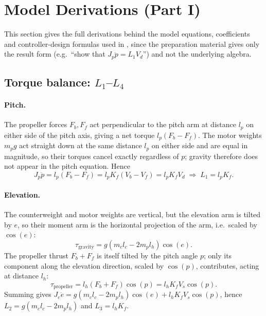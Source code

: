 \appendix

\section{Model Derivations (Part I)}\label{app:part1_derivations}
This section gives the full derivations behind the model equations, coefficients and controller-design formulas used in , since the preparation material gives only the result form (e.g.\ ``show that $J_p\ddot p=L_1V_d$'') and not the underlying algebra.

\subsection{Torque balance: $L_1$--$L_4$}\label{app:L_derivation}
\paragraph{Pitch.} The propeller forces $F_b,F_f$ act perpendicular to the pitch arm at distance $l_p$ on either side of the pitch axis, giving a net torque $l_p(F_b-F_f)$. The motor weights $m_pg$ act straight down at the same distance $l_p$ on either side and are equal in magnitude, so their torques cancel exactly regardless of $p$; gravity therefore does not appear in the pitch equation. Hence
\begin{equation}
	J_p\ddot p = l_p(F_b-F_f) = l_pK_f(V_b-V_f) = l_pK_fV_d \;\Rightarrow\; L_1=l_pK_f.
\end{equation}

\paragraph{Elevation.} The counterweight and motor weights are vertical, but the elevation arm is tilted by $e$, so their moment arm is the horizontal projection of the arm, i.e.\ scaled by $\cos(e)$:
\begin{equation}
	\tau_{\text{gravity}} = g(m_cl_c-2m_pl_h)\cos(e).
\end{equation}
The propeller thrust $F_b+F_f$ is itself tilted by the pitch angle $p$; only its component along the elevation direction, scaled by $\cos(p)$, contributes, acting at distance $l_h$:
\begin{equation}
	\tau_{\text{propeller}} = l_h(F_b+F_f)\cos(p) = l_hK_fV_s\cos(p).
\end{equation}
Summing gives $J_e\ddot e = g(m_cl_c-2m_pl_h)\cos(e) + l_hK_fV_s\cos(p)$, hence $L_2=g(m_cl_c-2m_pl_h)$ and $L_3=l_hK_f$.

